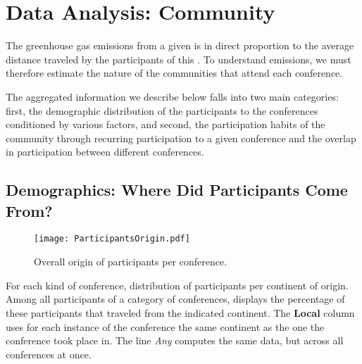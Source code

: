 \section{Data Analysis: Community}
\label{sec:community}

The greenhouse gas emissions from a given \event is in direct proportion to
the average distance traveled by the participants of this \event.
To understand emissions, we must therefore estimate the nature of the
communities that attend each conference.

The aggregated information we describe below falls into two main categories:
first, the demographic distribution of the participants to the conferences
conditioned by various factors, and second, the participation habits of the
community through recurring participation to a given conference and the
overlap in participation between different conferences.


\subsection{Demographics: Where Did Participants Come From?}
\label{subsec:demo}

\begin{figure}
  \centering
  \texttt{[image: ParticipantsOrigin.pdf]}
  \caption{Overall origin of participants per conference.}
  \label{fig:demo-per-conf}
\end{figure}

\begin{table}
    \centering

   \caption{For each kind of conference, distribution of participants per continent of origin.
     Among all participants of a category of conferences, displays the percentage of these participants that traveled from the indicated continent. The \textbf{Local} column uses for each instance of the conference the same continent as the one the conference took place in. The line \emph{Any} computes the same data, but across all conferences at once.
   }
\label{table:demo-per-conf}
\end{table}


